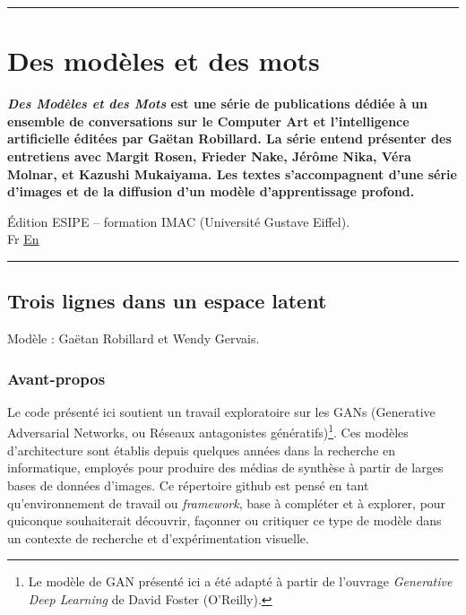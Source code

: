 \documentclass[
]{article}
\author{}
\date{}
\begin{document}
\begin{center}\rule{0.5\linewidth}{0.5pt}\end{center}

\hypertarget{des-moduxe8les-et-des-mots}{%
\section{Des modèles et des mots}\label{des-moduxe8les-et-des-mots}}

\textbf{\emph{Des Modèles et des Mots} est une série de publications dédiée à un ensemble de conversations sur le Computer Art et l'intelligence artificielle éditées par Gaëtan Robillard. La série entend présenter des entretiens avec Margit Rosen, Frieder Nake, Jérôme Nika, Véra Molnar, et Kazushi Mukaiyama. Les textes s'accompagnent d'une série d'images et de la diffusion d'un modèle d'apprentissage profond.}

Édition ESIPE -- formation IMAC (Université Gustave Eiffel).\\
Fr \textbar{} \href{https://github.com/robillardstudio/three-lines-in-latent-space/blob/main/README_EN.md}{En}

\begin{center}\rule{0.5\linewidth}{0.5pt}\end{center}

\hypertarget{trois-lignes-dans-un-espace-latent}{%
\subsection{Trois lignes dans un espace latent}\label{trois-lignes-dans-un-espace-latent}}

Modèle : Gaëtan Robillard et Wendy Gervais.

\hypertarget{avant-propos}{%
\subsubsection{Avant-propos}\label{avant-propos}}

Le code présenté ici soutient un travail exploratoire sur les GANs (Generative Adversarial Networks, ou Réseaux antagonistes génératifs)\footnote{Le modèle de GAN présenté ici a été adapté à partir de l'ouvrage \emph{Generative Deep Learning} de David Foster (O'Reilly).}. Ces modèles d'architecture sont établis depuis quelques années dans la recherche en informatique, employés pour produire des médias de synthèse à partir de larges bases de données d'images. Ce répertoire github est pensé en tant qu'environnement de travail ou \emph{framework}, base à compléter et à explorer, pour quiconque souhaiterait découvrir, façonner ou critiquer ce type de modèle dans un contexte de recherche et d'expérimentation visuelle.
\end{document}

